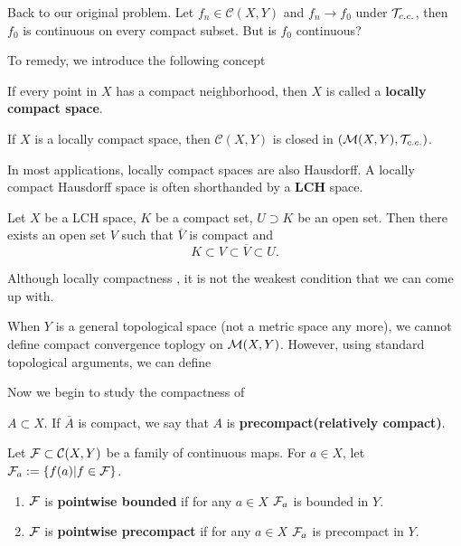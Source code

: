 Back to our original problem. Let $f_n\in\mathcal{C}(X,Y)$ and $f_n\to f_0$ under $\mathcal{T}_{c.c.}$,
then $f_0$ is continuous on every compact subset. But is $f_0$ continuous?
\begin{example}
    
\end{example}
To remedy, we introduce the following concept
\begin{definition}
    If every point in $X$ has a compact neighborhood, then $X$ is called a \textbf{locally compact space}.
\end{definition}
\begin{proposition}
    If $X$ is a locally compact space, then $\mathcal{C}(X,Y)$ is closed in $(\mathcal{M}(X,Y),\mathcal{T}_{c.c.})$.
\end{proposition}
In most applications, locally compact spaces are also Hausdorff. A locally compact Hausdorff space is often shorthanded by a \textbf{LCH} space.
\begin{proposition}
    Let $X$ be a LCH space, $K$ be a compact set, $U\supset K$ be an open set. Then there exists an open set $V$ such that $\overline{V}$ is compact and 
    $$ K\subset V\subset \overline{V}\subset U .$$
\end{proposition}

Although locally compactness , it is not the weakest condition that we can come up with.
\begin{definition}
    
\end{definition}

When $Y$ is a general topological space (not a metric space any more), we cannot define compact convergence toplogy on $\mathcal{M}(X,Y)$.
However, using standard topological arguments, we can define
\begin{definition}
    
\end{definition}

Now we begin to study the compactness of 
\begin{definition}
    $A\subset X$. If $\bar{A}$ is compact, we say that $A$ is \textbf{precompact(relatively compact)}.
\end{definition}

\begin{definition}
    Let $\mathcal{F}\subset \mathcal{C}(X,Y)$ be a family of continuous maps.
    For $a\in X$, let $\mathcal{F}_a:=\{f(a)|f\in\mathcal{F}\}$.
    \begin{enumerate}[label=(\roman*)]
        \item $\mathcal{F}$ is \textbf{pointwise bounded} if for any $a\in X$ $\mathcal{F}_a$ is bounded in $Y$.
        \item $\mathcal{F}$ is \textbf{pointwise precompact} if for any $a\in X$ $\mathcal{F}_a$ is precompact in $Y$.
    \end{enumerate}
\end{definition}

